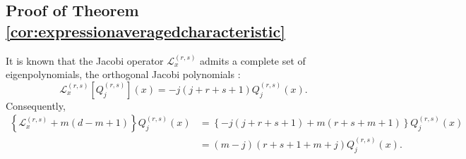 \documentclass[12pt,reqno]{amsart}
\begin{document}
\subsection{Proof of Theorem \ref{cor:expressionaveragedcharacteristic}}
It is known that the Jacobi operator $\mathcal{L}_x^{(r,s)}$ admits a complete set of eigenpolynomials, the orthogonal Jacobi polynomials :
\begin{equation*}
	\mathcal{L}_x^{(r,s)}[Q_j^{(r,s)}](x)= -j(j+r+s+1)Q_j^{(r,s)}(x).
\end{equation*}
Consequently,
\begin{align*}
	\left\{\mathcal{L}_x^{(r,s)} + m(d-m+1)\right\}Q_j^{(r,s)}(x) & =
	\left\{-j(j+r+s+1) + m(r+s+m+1)\right\}Q_j^{(r,s)}(x)
	\\& = (m-j)(r+s+1+m+j)Q_j^{(r,s)}(x).
\end{align*}
\end{document}

